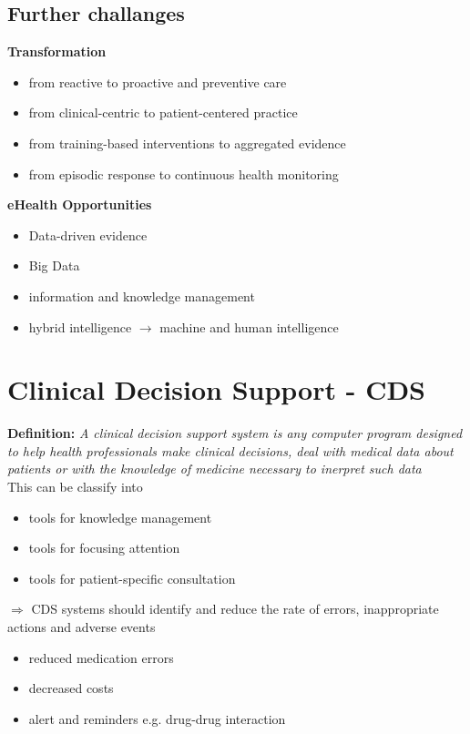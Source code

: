 \documentclass{report}
\theoremstyle{definition}
\theoremstyle{example}
\begin{document}
\subsection{Further challanges}
\textbf{Transformation}
\begin{itemize}
   \item from reactive to proactive and preventive care
   \item from clinical-centric to patient-centered practice
   \item from training-based interventions to aggregated evidence
   \item from episodic response to continuous health monitoring
\end{itemize}
\textbf{eHealth Opportunities}
\begin{itemize}
   \item Data-driven evidence
   \item Big Data
   \item information and knowledge management
   \item hybrid intelligence $\rightarrow$ machine and human intelligence
\end{itemize}

\section{Clinical Decision Support - CDS}
\textbf{Definition:} \textit{A clinical decision support system is any computer program designed to help health professionals make clinical decisions, deal with medical data about patients or with the knowledge of medicine necessary to inerpret such data}\\
This can be classify into
\begin{itemize}
   \item tools for knowledge management
   \item tools for focusing attention
   \item tools for patient-specific consultation
\end{itemize}
$\Rightarrow$ CDS systems should identify and reduce the rate of errors, inappropriate actions and adverse events
\begin{itemize}
   \item reduced medication errors
   \item decreased costs
   \item alert and reminders e.g. drug-drug interaction
\end{itemize}
\end{document}
